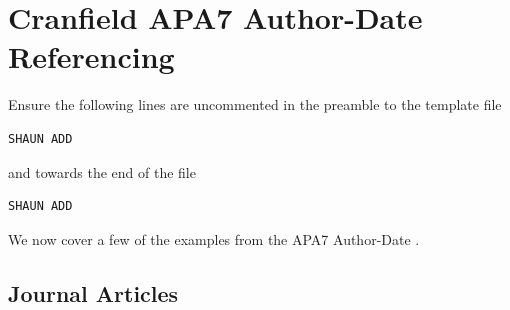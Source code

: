 \section{Cranfield APA7 Author-Date Referencing}
\label{sec:authordaterefs}
Ensure the following lines are uncommented in the preamble to the template file
\begin{verbatim}
SHAUN ADD
\end{verbatim}
and towards the end of the file
\begin{verbatim}
SHAUN ADD
\end{verbatim}

We now cover a few of the examples from the APA7 Author-Date \cite{cranfield_library_service_apa7_2021}. 

\subsection{Journal Articles}
\label{sec:NumberedJournal}
